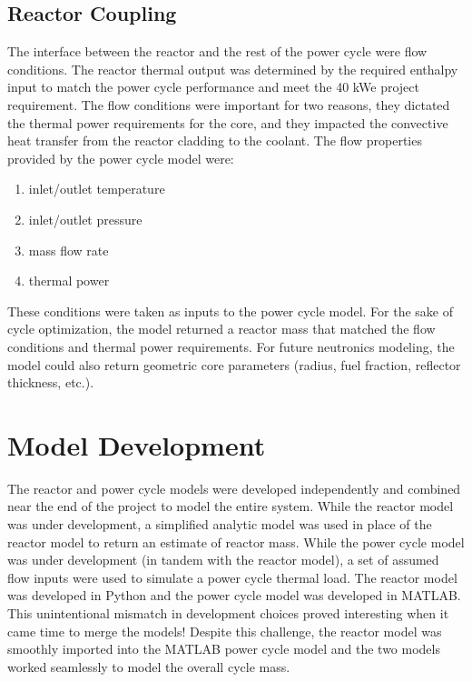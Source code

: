 \subsection{Reactor Coupling}
The interface between the reactor and the rest of the power cycle were flow
conditions. The reactor thermal output was determined by the required enthalpy
input to match the power cycle performance and meet the 40 kWe project
requirement. The flow conditions were important for two reasons, they dictated
the thermal power requirements for the core, and they impacted the convective
heat transfer from the reactor cladding to the coolant. The flow properties
provided by the power cycle model were:

\begin{enumerate}
    \item inlet/outlet temperature
    \item inlet/outlet pressure
    \item mass flow rate
    \item thermal power
\end{enumerate}

These conditions were taken as inputs to the power cycle model. For the sake of
cycle optimization, the model returned a reactor mass that matched the flow
conditions and thermal power requirements. For future neutronics modeling, the
model could also return geometric core parameters (radius, fuel fraction,
reflector thickness, etc.). 

\section{Model Development}
The reactor and power cycle models were developed independently and combined
near the end of the project to model the entire system. While the reactor model
was under development, a simplified analytic model was used in place of the
reactor model to return an estimate of reactor mass. While the power cycle model
was under development (in tandem with the reactor model), a set of assumed flow
inputs were used to simulate a power cycle thermal load. The reactor model was
developed in Python and the power cycle model was developed in MATLAB. This
unintentional mismatch in development choices proved interesting when it came
time to merge the models! Despite this challenge, the reactor model was smoothly
imported into the MATLAB power cycle model and the two models worked seamlessly
to model the overall cycle mass.
